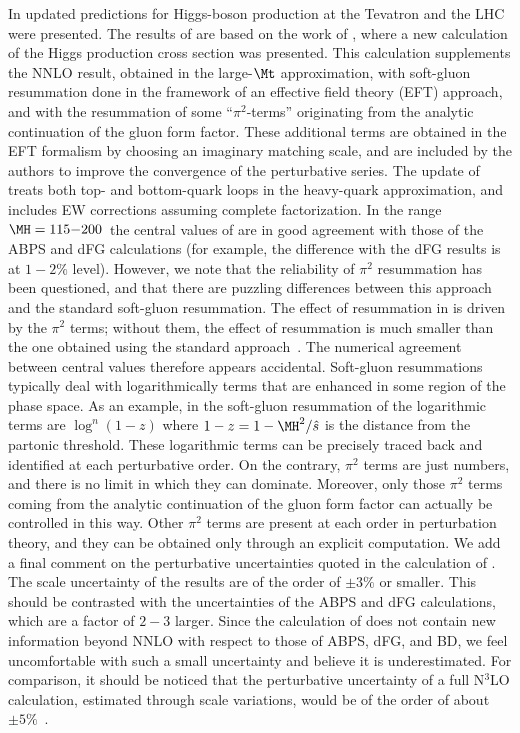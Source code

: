 In  updated predictions for Higgs-boson production at the Tevatron and the LHC were presented.
The results of  are based on the work of ,
where a new calculation of the Higgs production cross section was presented.
This calculation supplements the NNLO result, obtained in the large-$\Mt$ approximation, 
with soft-gluon resummation done in the framework of an effective field theory (EFT) approach, and with the resummation of
some ``$\pi^2$-terms'' originating from the analytic continuation of the gluon form factor.  These additional terms are obtained 
in the EFT formalism by choosing an imaginary matching scale, and are included by the authors to improve the convergence of the perturbative series.  
The update of  treats both top- and bottom-quark loops in the heavy-quark approximation, and includes EW corrections 
assuming complete factorization.  In the range $\MH=115{-}200$\UGeV\ the central values of  are in good agreement with those of the 
ABPS and dFG calculations (for example, the difference with the dFG results is at $1{-}2\%$ level).  However, we note that the reliability of $\pi^2$ resummation 
has been questioned, and that there are puzzling differences between this approach and the standard soft-gluon resummation.  The effect of 
resummation in  is driven by the $\pi^2$ terms; without them, the effect of resummation is much smaller than the one obtained using the 
standard approach~\cite{Ahrens:2008nc}.  The numerical agreement between central values therefore appears accidental.  
Soft-gluon resummations typically deal with logarithmically terms that are enhanced in some region of the phase space.
As an example, in the soft-gluon resummation of  the logarithmic terms are $\log^n(1-z)$ where
$1-z=1-\MH^2/{\hat s}$ is the distance from the partonic threshold. These logarithmic terms can be precisely traced back and identified at each 
perturbative order. On the contrary, $\pi^2$ terms are just numbers, and there is no limit in which they can dominate. Moreover, only those 
$\pi^2$ terms coming from the analytic continuation of the gluon form factor can actually be controlled in this way.  Other $\pi^2$ terms are
present at each order in perturbation theory, and they can be obtained only through an explicit computation.
We add a final comment on the perturbative uncertainties quoted in the calculation of . The scale uncertainty of the 
results are of the order of $\pm 3\%$ or smaller.
This should be contrasted with the uncertainties of the ABPS and dFG calculations, which are a factor of $2{-}3$ larger. Since the calculation of 
 does not contain new information beyond NNLO with respect to those of ABPS, dFG, and BD, we feel uncomfortable with such a 
small uncertainty and believe it is underestimated. For comparison, it should be noticed that the perturbative uncertainty of a full N$^3$LO
calculation, estimated through scale variations, would be of the order of about $\pm 5\%$~\cite{Moch:2005ky}.

\clearpage
